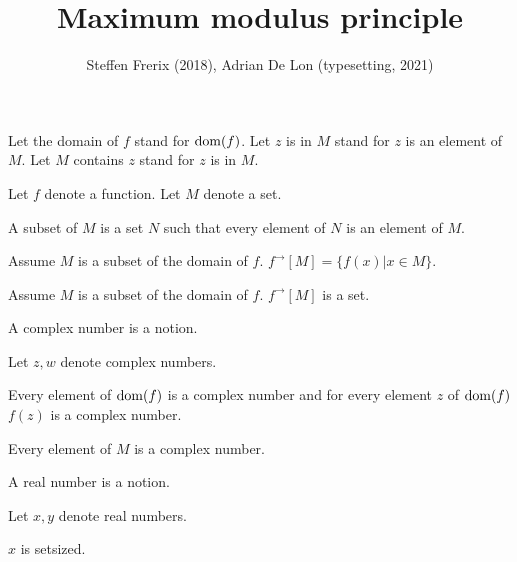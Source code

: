 \documentclass{article}
\title{Maximum modulus principle}
\author{Steffen Frerix (2018), Adrian De Lon (typesetting, 2021)}
\date{}
\newcommand{\image}[2]{#1^{\to}[#2]}
\begin{document}

  \maketitle

  \begin{forthel}

    Let the domain of $f$ stand for $\operatorname{dom}(f)$.
    Let $z$ is in $M$ stand for $z$ is an element of $M$.
    Let $M$ contains $z$ stand for $z$ is in $M$.

    Let $f$ denote a function.
    Let $M$ denote a set.

    \begin{definition}
      A subset of $M$ is a set $N$ such that
      every element of $N$ is an element of $M$.
    \end{definition}

    \begin{definition}
      Assume $M$ is a subset of the domain of $f$.
      $\image{f}{M} = \{ f(x) | x\in M \}$.
    \end{definition}

    \begin{axiom}
      Assume $M$ is a subset of the domain of $f$.
      $\image{f}{M}$ is a set.
    \end{axiom}

    \begin{signature}
      A complex number is a notion.
    \end{signature}

    Let $z, w$ denote complex numbers.

    \begin{axiom}
      Every element of $\operatorname{dom}(f)$ is a complex number and for every element $z$ of $\operatorname{dom}(f)$ $f(z)$ is a complex number.
    \end{axiom}

    \begin{axiom}
      Every element of $M$ is a complex number.
    \end{axiom}

    \begin{signature}
      A real number is a notion.
    \end{signature}

    Let $x,y$ denote real numbers.

    \begin{axiom}
      $x$ is setsized.
    \end{axiom}


\end{forthel}
\end{document}
